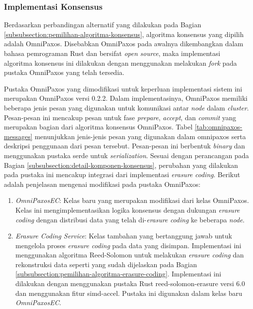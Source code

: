\subsubsection{Implementasi Konsensus}
\label{subsubsection:implementasi-konsensus}

Berdasarkan perbandingan alternatif yang dilakukan pada Bagian \ref{subsubsection:pemilihan-algoritma-konsensus}, algoritma konsensus yang dipilih adalah OmniPaxos. Disebabkan OmniPaxos pada awalnya dikembangkan dalam bahasa pemrograman Rust dan bersifat \textit{open source}, maka implementasi algoritma konsensus ini dilakukan dengan menggunakan melakukan \textit{fork} pada pustaka OmniPaxos yang telah tersedia.

Pustaka OmniPaxos yang dimodifikasi untuk keperluan implementasi sistem ini merupakan OmniPaxos versi 0.2.2. Dalam implementasinya, OmniPaxos memiliki beberapa jenis pesan yang digunakan untuk komunikasi antar \textit{node} dalam \textit{cluster}. Pesan-pesan ini mencakup pesan untuk fase \textit{prepare}, \textit{accept}, dan \textit{commit} yang merupakan bagian dari algoritma konsensus OmniPaxos. Tabel \ref{tab:omnipaxos-messages} menunjukkan jenis-jenis pesan yang digunakan dalam omnipaxos serta deskripsi penggunaan dari pesan tersebut. Pesan-pesan ini berbentuk \textit{binary} dan menggunakan pustaka serde untuk \textit{serialization}.
Sesuai dengan perancangan pada Bagian \ref{subsubsection:detail-komponen-konsensus}, perubahan yang dilakukan pada pustaka ini mencakup integrasi dari implementasi \textit{erasure coding}. Berikut adalah penjelasan mengenai modifikasi pada pustaka OmniPaxos:

\begin{enumerate}
	\item \textit{OmniPaxosEC}: Kelas baru yang merupakan modifikasi dari kelas OmniPaxos. Kelas ini mengimplementasikan logika konsensus dengan dukungan \textit{erasure coding} dengan distribusi data yang telah di-\textit{erasure coding} ke beberapa \textit{node}.
	\item \textit{Erasure Coding Service}: Kelas tambahan yang bertanggung jawab untuk mengelola proses \textit{erasure coding} pada data yang disimpan. Implementasi ini menggunakan algoritma Reed-Solomon untuk melakukan \textit{erasure coding} dan rekonstruksi data seperti yang sudah dijelaskan pada Bagian \ref{subsubsection:pemilihan-algoritma-erasure-coding}. Implementasi ini dilakukan dengan menggunakan pustaka Rust reed-solomon-erasure versi 6.0 dan menggunakan fitur simd-accel. Pustaka ini digunakan dalam kelas baru \textit{OmniPaxosEC}.
\end{enumerate}

